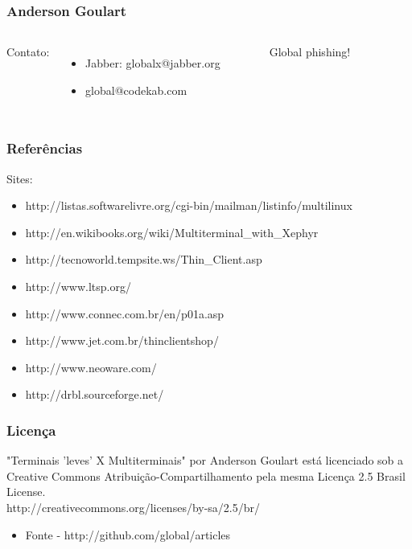 \documentclass[utf8,9pt]{beamer}
\begin{document}
  \begin{frame}
	  \frametitle{Anderson Goulart}

	  \begin{columns}
		  Contato:
		  \begin{itemize}
			  \item Jabber: globalx@jabber.org
			  \item global@codekab.com
		  \end{itemize}
			  \begin{figure}
				  \caption{Global phishing!}
			  \end{figure}
	  \end{columns}
  \end{frame}

	\begin{frame}
		\frametitle{Referências}
		Sites:
		\begin{itemize}
			\item http://listas.softwarelivre.org/cgi-bin/mailman/listinfo/multilinux
			\item http://en.wikibooks.org/wiki/Multiterminal\_with\_Xephyr
			\item http://tecnoworld.tempsite.ws/Thin\_Client.asp
			\item http://www.ltsp.org/
			\item http://www.connec.com.br/en/p01a.asp
			\item http://www.jet.com.br/thinclientshop/
			\item http://www.neoware.com/
			\item http://drbl.sourceforge.net/
		\end{itemize}

	\end{frame}

  \begin{frame}
	  \frametitle{Licença}
	  "Terminais 'leves' X Multiterminais" por Anderson Goulart está licenciado sob a Creative Commons Atribuição-Compartilhamento pela mesma Licença 2.5 Brasil License.\\

	  http://creativecommons.org/licenses/by-sa/2.5/br/\\

	  \begin{itemize}
		  \item Fonte - http://github.com/global/articles
	  \end{itemize}
  \end{frame}
\end{document}
